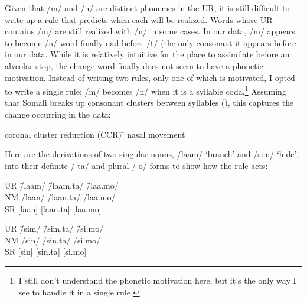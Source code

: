 \documentclass[doc,12pt]{apa6}
\begin{document}
Given that /m/ and /n/ are distinct phonemes in the UR, it is still difficult
to write up a rule that predicts when each will be realized. Words whose UR
contains /m/ are still realized with /n/ in some cases.  In our data, /m/
appears to become /n/ word finally nad before /t/ (the only consonant it
appears before in our data. While it is relatively intuitive for the place to
assimilate before an alveolar stop, the change word-finally does not seem to
have a phonetic motivation. Instead of writing two rules, only one of which is
motivated, I opted to write a single rule: /m/ becomes /n/ when it is a
syllable coda.\footnote{I still don't understand the phonetic motivation here,
but it's the only way I see to handle it in a single rule.} Assuming that
Somali breaks up consonant clusters between syllables (), this
captures the change occurring in the data:

\begin{exe}
	\ex \begin{tabbing}
		coronal cluster reduction (CCR) \= \kill
		nasal movement \>
		\phonr{\phonfeat{+nas\\-syl}}{
		       \phonfeat{-lab\\+cor}}{
		       {]}_\sigma}
		\end{tabbing}
\end{exe}

Here are the derivations of two singular nouns, /laam/ `branch' and /sim/
`hide', into their definite /-ta/ and plural /-o/ forms to show how the rule
acts:

\begin{exe}
	\ex \begin{tabbing}
		UR \hspace{2em} \= /laam/ \= /laam.ta/ \= /laa.mo/ \\
		NM \> /laan/ \> /laan.ta/ \> /laa.mo/ \\
		SR \> {[}laan{]} \> {[}laan.ta{]} \> {[}laa.mo{]}
		\end{tabbing}
	\ex \begin{tabbing}
		UR \hspace{2em} \= /sim/ \= /sim.ta/ \= /si.mo/ \\
		NM \> /sin/ \> /sin.ta/ \> /si.mo/ \\
		SR \> {[}sin{]} \> {[}sin.ta{]} \> {[}si.mo{]}
		\end{tabbing}
\end{exe}
\end{document}
